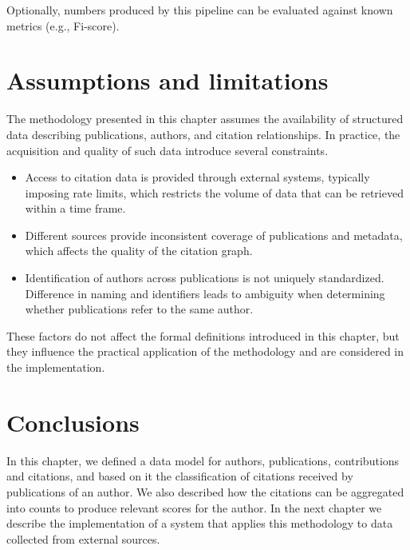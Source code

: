 Optionally, numbers produced by this pipeline can be evaluated against known metrics (e.g., \textsf{Fi-score}).

\section{Assumptions and limitations} \label{sec:assumption-and-limitations}

The methodology presented in this chapter assumes the availability of structured data describing publications, authors, and citation relationships.
In practice, the acquisition and quality of such data introduce several constraints.

\begin{itemize}
    \item Access to citation data is provided through external systems, typically imposing rate limits, which restricts the volume of data that can be retrieved within a time frame.
    \item Different sources provide inconsistent coverage of publications and metadata, which affects the quality of the citation graph.
    \item Identification of authors across publications is not uniquely standardized.
    Difference in naming and identifiers leads to ambiguity when determining whether publications refer to the same author.
\end{itemize}

These factors do not affect the formal definitions introduced in this chapter, but they influence the practical application of the methodology and are considered in the implementation.

\section{Conclusions} \label{sec:ch3-conclusions}

In this chapter, we defined a data model for authors, publications, contributions and citations, and based on it the classification of citations received by publications of an author.
We also described how the citations can be aggregated into counts to produce relevant scores for the author.
In the next chapter we describe the implementation of a system that applies this methodology to data collected from external sources.
